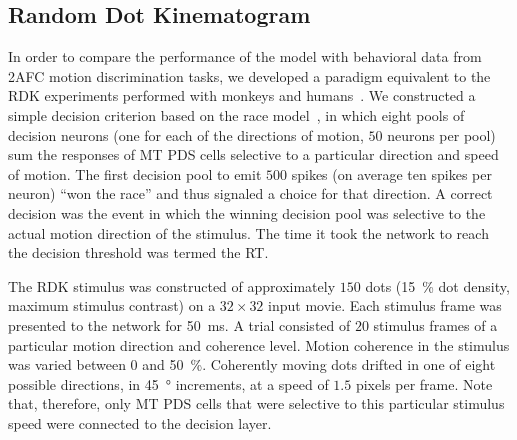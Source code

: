 \subsection{Random Dot Kinematogram}
\label{sec:MT|results|RDK}
In order to compare the performance of the model with behavioral
data from \ac{2AFC} motion discrimination tasks, we
developed a paradigm equivalent to the \ac{RDK} experiments
performed with monkeys and 
humans~\citep{RoitmanShadlen2002,Resulaj2009}.
We constructed a simple decision
criterion based on the race 
model~\citep{ShadlenNewsome2001,SmithRatcliff2004},
in which eight pools of
decision neurons (one for each of the directions of motion,
$50$ neurons per pool) sum the responses of \ac{MT} \ac{PDS} cells
selective to a particular direction and speed of motion. The
first decision pool to emit $500$ spikes (on average ten spikes
per neuron) ``won the race'' and thus signaled a choice for that
direction. A correct decision was the event in which the
winning decision pool was selective to the actual motion
direction of the stimulus. The time it took the network to reach
the decision threshold was termed the \ac{RT}.

The \ac{RDK} stimulus was constructed of approximately
$150$ dots (\SI{15}{\percent} dot density, 
maximum stimulus contrast) on a
$32\times32$ input movie. 
Each stimulus frame was presented to the
network for \SI{50}{\milli\second}. 
A trial consisted of $20$ stimulus frames of a
particular motion direction and coherence level. Motion coherence
in the stimulus was varied between $0$ and \SI{50}{\percent}.
Coherently moving dots drifted in one of eight possible directions,
in \SI{45}{\degree} increments, at a speed of $1.5$ pixels per frame.
Note that, therefore, only \ac{MT} \ac{PDS} cells that were 
selective to this particular stimulus speed were connected 
to the decision layer.


